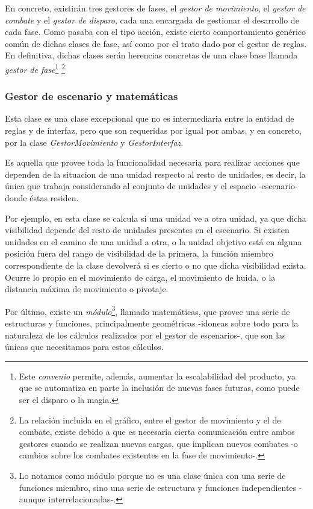 En concreto, existirán tres gestores de fases, el \emph{gestor de
  movimiento}, el \emph{gestor de combate} y el \emph{gestor de
  disparo}, cada una encargada de gestionar el desarrollo de cada
fase. Como pasaba con el tipo acción, existe cierto comportamiento
genérico común de dichas clases de fase, así como por el trato dado
por el gestor de reglas. En definitiva, dichas clases serán herencias
concretas de una clase base llamada \emph{gestor de
  fase}\footnote{Este \emph{convenio} permite, además, 
  aumentar la escalabilidad del producto, ya que se automatiza en
  parte la inclusión de nuevas fases futuras, como puede ser el
  disparo o la magia.} \footnote{La relación incluida en el gráfico,
  entre el gestor de movimiento y el de combate, existe debido a que
  es necesaria cierta comunicación entre ambos gestores cuando se
  realizan nuevas cargas, que implican nuevos combates -o cambios
  sobre los combates existentes en la fase de movimiento-.}

\subsubsection{Gestor de escenario y matemáticas}
Esta clase es una clase excepcional que no es intermediaria entre la
entidad de reglas y de interfaz, pero que son requeridas por igual por
ambas, y en concreto, por la clase \emph{GestorMovimiento} y
\emph{GestorInterfaz}.

Es aquella que provee toda la funcionalidad necesaria para
realizar acciones que dependen de la situacion de una unidad respecto
al resto de unidades, es decir, la única que trabaja considerando al
conjunto de unidades y el espacio -escenario- donde éstas residen.

Por ejemplo, en esta clase se calcula si una unidad ve
 a otra unidad, ya que dicha visibilidad depende
del resto de unidades presentes en el escenario. Si existen unidades
en el camino de una unidad a otra, o la unidad objetivo está en alguna
posición fuera del rango de visibilidad de la primera, la función 
miembro correspondiente de la clase devolverá si es cierto o no que
dicha visibilidad exista. Ocurre lo propio en el movimiento de carga,
el movimiento de huida, o la distancia máxima de movimiento o
pivotaje.

Por último, existe un \emph{módulo}\footnote{Lo notamos como módulo
  porque no es una clase única con una serie de funciones miembro,
  sino una serie de estructura y funciones independientes -aunque
  interrelacionadas-.}, llamado matemáticas, que provee una serie de
estructuras y funciones, principalmente geométricas -idoneas sobre
todo para la naturaleza de los cálculos realizados por el gestor de
escenarios-, que son las únicas que necesitamos para estos
cálculos.

